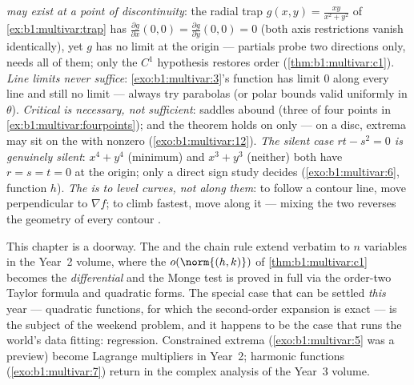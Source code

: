 \begin{remark}
\label{rem:b1:multivar:pitfalls}
\emph{ may exist at a point of
discontinuity}: the radial trap $g(x,y) = \frac{xy}{x^2+y^2}$ of
\cref{ex:b1:multivar:trap} has $\frac{\partial g}{\partial
x}(0,0) = \frac{\partial g}{\partial y}(0,0) = 0$ (both axis
restrictions vanish identically), yet $g$ has no limit at the
origin --- partials probe two directions only,  needs
all of them; only the $C^1$ hypothesis restores order
(\cref{thm:b1:multivar:c1}).
\emph{Line limits never suffice}: \cref{exo:b1:multivar:3}'s
function has limit $0$ along every line and still no limit ---
always try parabolas (or polar bounds valid uniformly in
$\theta$).
\emph{Critical is necessary, not sufficient}: saddles abound
(three of four points in \cref{ex:b1:multivar:fourpoints}); and
the theorem holds on \emph{}  only --- on a  disc,
extrema may sit on the  with nonzero 
(\cref{exo:b1:multivar:12}).
\emph{The silent case $rt - s^2 = 0$ is genuinely silent}: $x^4
+ y^4$ (minimum) and $x^3 + y^3$ (neither) both have $r = s = t
= 0$ at the origin; only a direct sign study decides
(\cref{exo:b1:multivar:6}, function $h$).
\emph{The  is  to level curves, not along
them}: to follow a contour line, move perpendicular to $\nabla
f$; to climb fastest, move along it --- mixing the two reverses
the geometry of every contour .
\end{remark}

\begin{remark}
\label{rem:b1:multivar:whereused}
This chapter is a doorway. The  and the chain rule extend
verbatim to $n$ variables in the Year~2 volume, where the
$o(\norm{(h,k)})$ of \cref{thm:b1:multivar:c1} becomes the
\emph{differential} and the Monge test is proved in full via the
order-two Taylor formula and quadratic forms. The special case
that can be settled \emph{this} year --- quadratic functions,
for which the second-order expansion is exact --- is the subject
of the weekend problem, and it happens to be the case that runs
the world's data fitting:  regression. Constrained
extrema (\cref{exo:b1:multivar:5} was a preview) become Lagrange
multipliers in Year~2; harmonic functions
(\cref{exo:b1:multivar:7}) return in the complex analysis of the
Year~3 volume.
\end{remark}

